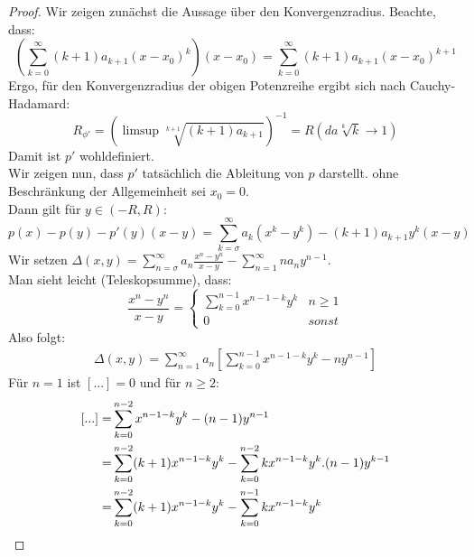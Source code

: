 \begin{proof}
Wir zeigen zunächst die Aussage über den Konvergenzradius. 
	Beachte, dass: 
	\begin{equation*}
		\left(\sum_{k=0}^{\infty} \left( k+1 \right) a_{k+1} \left( x -x_0 \right)^k \right)
		\left(x-x_0\right) = \sum_{k=0}^{\infty} \left(k+1\right) 
		a_{k+1} \left(x-x_0\right)^{k+1}
	\end{equation*}
	Ergo, für den Konvergenzradius der obigen Potenzreihe ergibt sich nach Cauchy-
	Hadamard:
	\begin{equation*}
		R_{\phi'} = \left(\limsup \sqrt[k+1]{\left(k+1\right)a_{k+1}}\right)^{-1}
		= R \left(\textit{da} \sqrt[k]{k} \rightarrow 1\right)
	\end{equation*}
	Damit ist $p'$ wohldefiniert.\\
	 Wir zeigen nun, dass $p'$ tatsächlich die Ableitung von $p$ darstellt. 
	 ohne Beschränkung der Allgemeinheit sei $x_0 = 0$. \\
	Dann gilt für $y \in \left(-R,R\right)$:
	\begin{equation*}
		p\left(x\right)-p\left(y\right) - p'\left(y\right)\left(x-y\right) 
		= \sum_{k= \sigma}^{\infty} a_k \left(x^k -y^k\right) - \left(k+1\right) 
		a_{k+1} y^k\left(x-y\right)
	\end{equation*}
	Wir setzen $\Delta\left(x,y\right) = \sum_{n=\sigma}^{\infty} a_n 
	\frac{x^n - y^n}{x-y} - \sum_{n = 1}^{\infty}n a_n y^{n-1}$. \\
	Man sieht leicht (Teleskopsumme), dass:
	\begin{equation*}
		\frac{x^n-y^n}{x-y} = \begin{cases}\sum_{k=0}^{n-1}x^{n-1-k}y^k & n \geq 1 
		\\ 0 & sonst \end{cases}
	\end{equation*}
	Also folgt: 
	\begin{align}
		\Delta\left(x,y\right) = \sum_{n=1}^{\infty} a_n \left[ \sum_{k=0}^{n-1} 
		x^{n-1-k}y^k -ny^{n-1}\right]
	\end{align}
	Für $n=1$ ist $\left[...\right] = 0$ und für $n\geq 2$: 
	\begin{align}
		\left[...\right]  = & \sum_{k=0}^{n-2} x^{n-1-k}y^k - (n-1)y^{n-1} \\
		 = & \sum_{k=0}^{n-2} (k+1) x^{n-1-k}y^k - \sum_{k=0}^{n-2}kx^{n-1-k}y^k 
		.(n-1)y^{k-1} \notag \\
		= & \sum_{k=0}^{n-2} (k+1) x^{n-1-k}y^k - \sum_{k=0}^{n-1}kx^{n-1-k}y^k 	

\end{align}
\end{proof}
